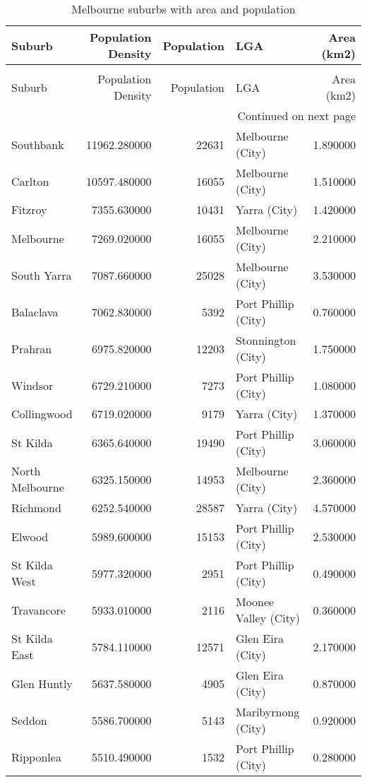 \begin{longtable}{lrrlr}
\caption{Melbourne suburbs with area and population} \label{tab:mel_subs} \\
\toprule
Suburb & Population Density & Population & LGA & Area (km2) \\
\midrule
\endfirsthead
\caption[]{Melbourne suburbs with area and population} \\
\toprule
Suburb & Population Density & Population & LGA & Area (km2) \\
\midrule
\endhead
\midrule
\multicolumn{5}{r}{Continued on next page} \\
\midrule
\endfoot
\bottomrule
\endlastfoot
Southbank & 11962.280000 & 22631 & Melbourne (City) & 1.890000 \\
Carlton & 10597.480000 & 16055 & Melbourne (City) & 1.510000 \\
Fitzroy & 7355.630000 & 10431 & Yarra (City) & 1.420000 \\
Melbourne & 7269.020000 & 16055 & Melbourne (City) & 2.210000 \\
South Yarra & 7087.660000 & 25028 & Melbourne (City) & 3.530000 \\
Balaclava & 7062.830000 & 5392 & Port Phillip (City) & 0.760000 \\
Prahran & 6975.820000 & 12203 & Stonnington (City) & 1.750000 \\
Windsor & 6729.210000 & 7273 & Port Phillip (City) & 1.080000 \\
Collingwood & 6719.020000 & 9179 & Yarra (City) & 1.370000 \\
St Kilda & 6365.640000 & 19490 & Port Phillip (City) & 3.060000 \\
North Melbourne & 6325.150000 & 14953 & Melbourne (City) & 2.360000 \\
Richmond & 6252.540000 & 28587 & Yarra (City) & 4.570000 \\
Elwood & 5989.600000 & 15153 & Port Phillip (City) & 2.530000 \\
St Kilda West & 5977.320000 & 2951 & Port Phillip (City) & 0.490000 \\
Travancore & 5933.010000 & 2116 & Moonee Valley (City) & 0.360000 \\
St Kilda East & 5784.110000 & 12571 & Glen Eira (City) & 2.170000 \\
Glen Huntly & 5637.580000 & 4905 & Glen Eira (City) & 0.870000 \\
Seddon & 5586.700000 & 5143 & Maribyrnong (City) & 0.920000 \\
Ripponlea & 5510.490000 & 1532 & Port Phillip (City) & 0.280000 \\

\end{longtable}
